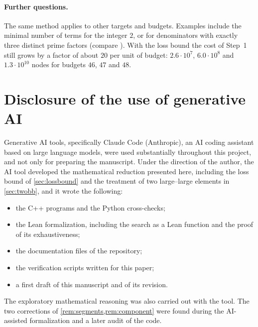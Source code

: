 \documentclass[11pt]{article}
\begin{document}
\paragraph{Further questions.}
The same method applies to other targets and budgets. Examples include the minimal number of terms for the integer $2$, or for denominators with exactly three distinct prime factors (compare \cite{ButlerErdosGraham2015}). With the loss bound the cost of Step~1 still grows by a factor of about $20$ per unit of budget: $2.6\cdot10^{7}$, $6.0\cdot10^{8}$ and $1.3\cdot10^{10}$ nodes for budgets $46$, $47$ and $48$.

\section{Disclosure of the use of generative AI}\label{sec:ai}

Generative AI tools, specifically Claude Code (Anthropic), an AI coding assistant based on large language models, were used substantially throughout this project, and not only for preparing the manuscript.
Under the direction of the author, the AI tool developed the mathematical reduction presented here, including the loss bound of \cref{sec:lossbound} and the treatment of two large--large elements in \cref{sec:twobb}, and it wrote the following:
\begin{itemize}
\item the C++ programs and the Python cross-checks;
\item the Lean formalization, including the search as a Lean function and the proof of its exhaustiveness;
\item the documentation files of the repository;
\item the verification scripts written for this paper;
\item a first draft of this manuscript and of its revision.
\end{itemize}
The exploratory mathematical reasoning was also carried out with the tool.
The two corrections of \cref{rem:segments,rem:component} were found during the AI-assisted formalization and a later audit of the code.
\end{document}
